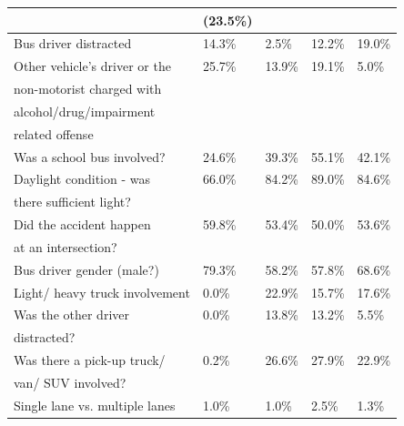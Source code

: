 \begin{table}[t]
{\begin{tabular}{@{}lllll@{}}
                                                  &  (23.5\%)               &                                      &                                   & \\ \midrule
Bus driver distracted                 & 14.3\%              & {\color[HTML]{9A0000} 2.5\%}         & 12.2\% & 19.0\%  \\ \midrule
Other vehicle's driver or the     & {\color[HTML]{9A0000} 25.7\%}        &13.9\%   & 19.1\%                       & 5.0\% \\
non-motorist charged with         & & & & \\
alcohol/drug/impairment           & & & & \\
related offense                   & & & & \\ \midrule
Was a school bus involved?      &24.6\%  & 39.3\% & {\color[HTML]{9A0000} 55.1\%} & 42.1\%  \\ \midrule
Daylight condition - was          & {\color[HTML]{9A0000} 66.0\%} & 84.2\%  & 89.0\% & 84.6\%  \\
there sufficient light?           & & & & \\ \midrule
Did the accident happen           & 59.8\% & 53.4\% & 50.0\% &  53.6\%  \\
at an intersection?               & & & & \\ \midrule
Bus driver gender (male?)         & 79.3\% & 58.2\% & 57.8\% & 68.6\%  \\ \midrule
Light/ heavy truck involvement    &  0.0\% &  22.9\% & 15.7\% & 17.6\%  \\ \midrule
Was the other driver            & 0.0\% &  13.8\% & 13.2\% & 5.5\%  \\
distracted?                           & & & & \\ \midrule
Was there a pick-up truck/        &0.2\%  & 26.6\%  & 27.9\% &  22.9\%  \\
van/ SUV involved?                & & & & \\ \midrule
Single lane vs. multiple lanes    &1.0\% & 1.0\% & 2.5\% & 1.3\% \\ \bottomrule
        \end{tabular}
        }
\end{table}
